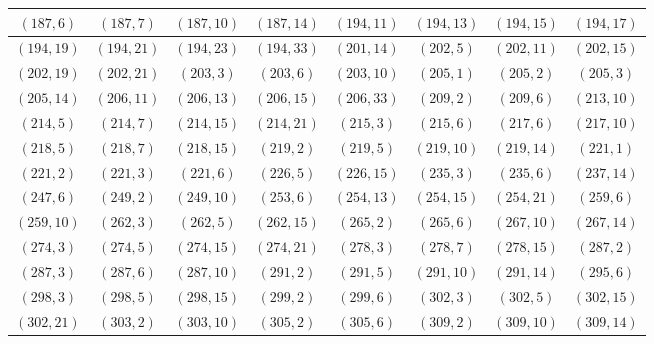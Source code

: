 \documentclass[11pt,reqno]{amsart}
\theoremstyle{definition}
\begin{document}
\begin{longtable}{|c|c|c|c|c|c|c|c|}
$ ( 187 , 6 )$
 & 
$ ( 187 , 7 )$
 & 
$ ( 187 , 10 )$
 & 
$ ( 187 , 14 )$
 & 
$ ( 194 , 11 )$
 & 
$ ( 194 , 13 )$
 & 
$ ( 194 , 15 )$
 & 
$ ( 194 , 17 )$
\\ \hline
$ ( 194 , 19 )$
 & 
$ ( 194 , 21 )$
 & 
$ ( 194 , 23 )$
 & 
$ ( 194 , 33 )$
 & 
$ ( 201 , 14 )$
 & 
$ ( 202 , 5 )$
 & 
$ ( 202 , 11 )$
 & 
$ ( 202 , 15 )$
\\ \hline
$ ( 202 , 19 )$
 & 
$ ( 202 , 21 )$
 & 
$ ( 203 , 3 )$
 & 
$ ( 203 , 6 )$
 & 
$ ( 203 , 10 )$
 & 
$ ( 205 , 1 )$
 & 
$ ( 205 , 2 )$
 & 
$ ( 205 , 3 )$
\\ \hline
$ ( 205 , 14 )$
 & 
$ ( 206 , 11 )$
 & 
$ ( 206 , 13 )$
 & 
$ ( 206 , 15 )$
 & 
$ ( 206 , 33 )$
 & 
$ ( 209 , 2 )$
 & 
$ ( 209 , 6 )$
 & 
$ ( 213 , 10 )$
\\ \hline
$ ( 214 , 5 )$
 & 
$ ( 214 , 7 )$
 & 
$ ( 214 , 15 )$
 & 
$ ( 214 , 21 )$
 & 
$ ( 215 , 3 )$
 & 
$ ( 215 , 6 )$
 & 
$ ( 217 , 6 )$
 & 
$ ( 217 , 10 )$
\\ \hline
$ ( 218 , 5 )$
 & 
$ ( 218 , 7 )$
 & 
$ ( 218 , 15 )$
 & 
$ ( 219 , 2 )$
 & 
$ ( 219 , 5 )$
 & 
$ ( 219 , 10 )$
 & 
$ ( 219 , 14 )$
 & 
$ ( 221 , 1 )$
\\ \hline
$ ( 221 , 2 )$
 & 
$ ( 221 , 3 )$
 & 
$ ( 221 , 6 )$
 & 
$ ( 226 , 5 )$
 & 
$ ( 226 , 15 )$
 & 
$ ( 235 , 3 )$
 & 
$ ( 235 , 6 )$
 & 
$ ( 237 , 14 )$
\\ \hline
$ ( 247 , 6 )$
 & 
$ ( 249 , 2 )$
 & 
$ ( 249 , 10 )$
 & 
$ ( 253 , 6 )$
 & 
$ ( 254 , 13 )$
 & 
$ ( 254 , 15 )$
 & 
$ ( 254 , 21 )$
 & 
$ ( 259 , 6 )$
\\ \hline
$ ( 259 , 10 )$
 & 
$ ( 262 , 3 )$
 & 
$ ( 262 , 5 )$
 & 
$ ( 262 , 15 )$
 & 
$ ( 265 , 2 )$
 & 
$ ( 265 , 6 )$
 & 
$ ( 267 , 10 )$
 & 
$ ( 267 , 14 )$
\\ \hline
$ ( 274 , 3 )$
 & 
$ ( 274 , 5 )$
 & 
$ ( 274 , 15 )$
 & 
$ ( 274 , 21 )$
 & 
$ ( 278 , 3 )$
 & 
$ ( 278 , 7 )$
 & 
$ ( 278 , 15 )$
 & 
$ ( 287 , 2 )$
\\ \hline
$ ( 287 , 3 )$
 & 
$ ( 287 , 6 )$
 & 
$ ( 287 , 10 )$
 & 
$ ( 291 , 2 )$
 & 
$ ( 291 , 5 )$
 & 
$ ( 291 , 10 )$
 & 
$ ( 291 , 14 )$
 & 
$ ( 295 , 6 )$
\\ \hline
$ ( 298 , 3 )$
 & 
$ ( 298 , 5 )$
 & 
$ ( 298 , 15 )$
 & 
$ ( 299 , 2 )$
 & 
$ ( 299 , 6 )$
 & 
$ ( 302 , 3 )$
 & 
$ ( 302 , 5 )$
 & 
$ ( 302 , 15 )$
\\ \hline
$ ( 302 , 21 )$
 & 
$ ( 303 , 2 )$
 & 
$ ( 303 , 10 )$
 & 
$ ( 305 , 2 )$
 & 
$ ( 305 , 6 )$
 & 
$ ( 309 , 2 )$
 & 
$ ( 309 , 10 )$
 & 
$ ( 309 , 14 )$
\\ \hline

\end{longtable}
\end{document}
